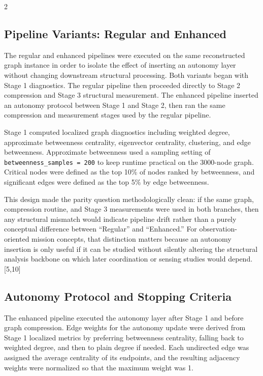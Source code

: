 \documentclass[fleqn,10pt,letterpaper]{article}
\begin{document}
\begin{multicols}{2}
\subsection{Pipeline Variants: Regular and Enhanced}

The regular and enhanced pipelines were executed on the same reconstructed graph instance in order to isolate the effect of inserting an autonomy layer without changing downstream structural processing. Both variants began with Stage 1 diagnostics. The regular pipeline then proceeded directly to Stage 2 compression and Stage 3 structural measurement. The enhanced pipeline inserted an autonomy protocol between Stage 1 and Stage 2, then ran the same compression and measurement stages used by the regular pipeline.

Stage 1 computed localized graph diagnostics including weighted degree, approximate betweenness centrality, eigenvector centrality, clustering, and edge betweenness. Approximate betweenness used a sampling setting of \texttt{betweenness\_samples = 200} to keep runtime practical on the 3000-node graph. Critical nodes were defined as the top 10\% of nodes ranked by betweenness, and significant edges were defined as the top 5\% by edge betweenness.

This design made the parity question methodologically clean: if the same graph, compression routine, and Stage 3 measurements were used in both branches, then any structural mismatch would indicate pipeline drift rather than a purely conceptual difference between “Regular” and “Enhanced.” For observation-oriented mission concepts, that distinction matters because an autonomy insertion is only useful if it can be studied without silently altering the structural analysis backbone on which later coordination or sensing studies would depend.[5,10]


\subsection{Autonomy Protocol and Stopping Criteria}

The enhanced pipeline executed the autonomy layer after Stage 1 and before graph compression. Edge weights for the autonomy update were derived from Stage 1 localized metrics by preferring betweenness centrality, falling back to weighted degree, and then to plain degree if needed. Each undirected edge was assigned the average centrality of its endpoints, and the resulting adjacency weights were normalized so that the maximum weight was 1.


\end{multicols}
\end{document}
